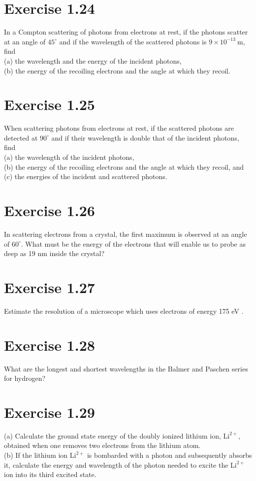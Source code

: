 \documentclass[10pt]{article}
\begin{document}
\section*{Exercise 1.24}
In a Compton scattering of photons from electrons at rest, if the photons scatter at an angle of $45^{\circ}$ and if the wavelength of the scattered photons is $9 \times 10^{-13} \mathrm{~m}$, find\\
(a) the wavelength and the energy of the incident photons,\\
(b) the energy of the recoiling electrons and the angle at which they recoil.

\section*{Exercise 1.25}
When scattering photons from electrons at rest, if the scattered photons are detected at $90^{\circ}$ and if their wavelength is double that of the incident photons, find\\
(a) the wavelength of the incident photons,\\
(b) the energy of the recoiling electrons and the angle at which they recoil, and\\
(c) the energies of the incident and scattered photons.

\section*{Exercise 1.26}
In scattering electrons from a crystal, the first maximum is observed at an angle of $60^{\circ}$. What must be the energy of the electrons that will enable us to probe as deep as 19 nm inside the crystal?

\section*{Exercise 1.27}
Estimate the resolution of a microscope which uses electrons of energy 175 eV .

\section*{Exercise 1.28}
What are the longest and shortest wavelengths in the Balmer and Paschen series for hydrogen?

\section*{Exercise 1.29}
(a) Calculate the ground state energy of the doubly ionized lithium ion, $\mathrm{Li}^{2+}$, obtained when one removes two electrons from the lithium atom.\\
(b) If the lithium ion $\mathrm{Li}^{2+}$ is bombarded with a photon and subsequently absorbs it, calculate the energy and wavelength of the photon needed to excite the $\mathrm{Li}^{2+}$ ion into its third excited state.
\end{document}
